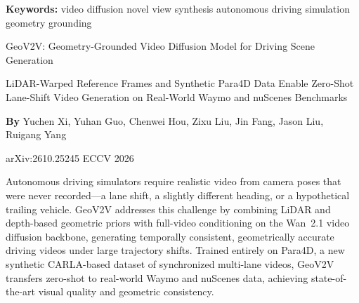 \documentclass[10pt,twocolumn]{article}
\begin{document}
\setlength{\parindent}{0pt}
\setlength{\parskip}{4pt}

{\small\color{keywordgray}\textbf{Keywords:}
  video diffusion \textbullet{}
  novel view synthesis \textbullet{}
  autonomous driving simulation \textbullet{}
  geometry grounding}\par\vspace{4pt}

{\LARGE\bfseries\raggedright
  GeoV2V: Geometry-Grounded Video Diffusion Model
  for Driving Scene Generation}\par\vspace{4pt}

{\large\itshape\raggedright
  LiDAR-Warped Reference Frames and Synthetic Para4D Data Enable
  Zero-Shot Lane-Shift Video Generation on Real-World Waymo
  and nuScenes Benchmarks}\par\vspace{6pt}

{\small\textbf{By} Yuchen Xi, Yuhan Guo, Chenwei Hou, Zixu Liu,
  Jin Fang, Jason Liu, Ruigang Yang}\par\vspace{2pt}

{\small\color{keywordgray}arXiv:2610.25245 \textbullet{}
  ECCV 2026}
\par\vspace{2pt}\noindent{\color{rulered}\rule{\columnwidth}{0.6pt}}\vspace{6pt}

Autonomous driving simulators require realistic video from camera
poses that were never recorded---a lane shift, a slightly different
heading, or a hypothetical trailing vehicle. GeoV2V addresses this
challenge by combining LiDAR and depth-based geometric priors with
full-video conditioning on the Wan~2.1 video diffusion backbone,
generating temporally consistent, geometrically accurate driving
videos under large trajectory shifts. Trained entirely on Para4D,
a new synthetic CARLA-based dataset of synchronized multi-lane videos,
GeoV2V transfers zero-shot to real-world Waymo and nuScenes data,
achieving state-of-the-art visual quality and geometric consistency.
\end{document}

